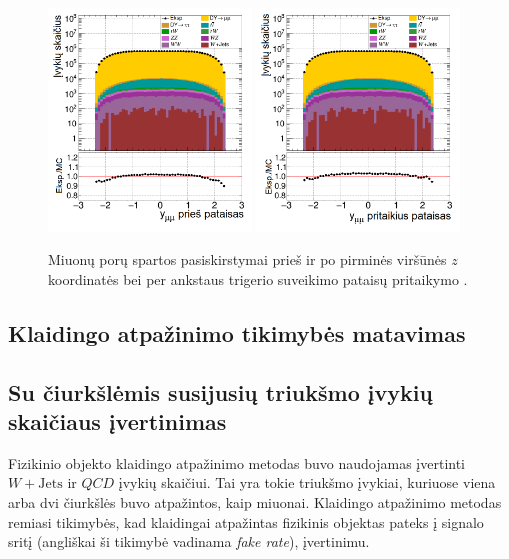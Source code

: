 \documentclass[a4paper, 12pt, oneside]{article}
\newcommand{\WJets}{W\! +\!\mathrm{Jets}}
\newcommand{\QCD}{QC\! D}
\begin{document}
\begin{figure}[b!]
	\includegraphics[width=0.48\textwidth]{Kursinis3/mumu_rapi_beforePVz.png}
	\includegraphics[width=0.48\textwidth]{Kursinis3/mumu_rapi_after.png}
	\vspace{-0.5cm}
	\caption{\label{fig:rapiba} Miuonų porų spartos pasiskirstymai prieš ir po pirminės viršūnės $z$ koordinatės bei per ankstaus
	trigerio suveikimo pataisų pritaikymo \cite{MAk2}.}
\end{figure}


\subsection{Klaidingo atpažinimo tikimybės matavimas}


\subsection{Su čiurkšlėmis susijusių triukšmo įvykių skaičiaus įvertinimas}
Fizikinio objekto klaidingo atpažinimo metodas buvo naudojamas įvertinti $\WJets$ ir $\QCD$ įvykių skaičiui.
Tai yra tokie triukšmo įvykiai, kuriuose viena arba dvi čiurkšlės buvo atpažintos, kaip miuonai.
Klaidingo atpažinimo metodas remiasi tikimybės, kad klaidingai atpažintas fizikinis objektas pateks į signalo sritį
(angliškai ši tikimybė vadinama \textit{fake rate}), įvertinimu.
\end{document}
